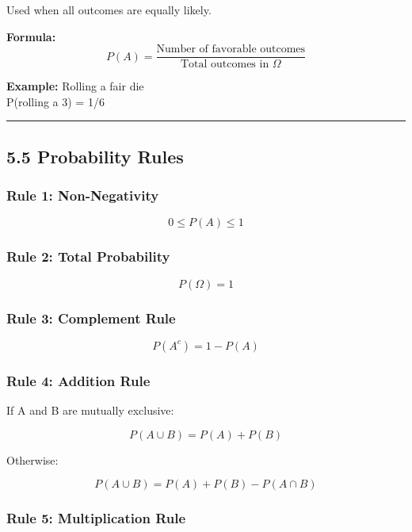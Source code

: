 \documentclass[
  letterpaper,
  DIV=11,
  numbers=noendperiod]{scrreprt}
\begin{document}
Used when all outcomes are equally likely.

\textbf{Formula:} \[
P(A) = \frac{\text{Number of favorable outcomes}}{\text{Total outcomes in } \Omega}
\]

\textbf{Example:} Rolling a fair die\\
P(rolling a 3) = 1/6

\begin{center}\rule{0.5\linewidth}{0.5pt}\end{center}

\subsection{5.5 Probability Rules}\label{probability-rules}

\subsubsection{Rule 1: Non-Negativity}\label{rule-1-non-negativity}

\[
0 \leq P(A) \leq 1
\]

\subsubsection{Rule 2: Total
Probability}\label{rule-2-total-probability}

\[
P(\Omega) = 1
\]

\subsubsection{Rule 3: Complement Rule}\label{rule-3-complement-rule}

\[
P(A^c) = 1 - P(A)
\]

\subsubsection{Rule 4: Addition Rule}\label{rule-4-addition-rule}

If A and B are mutually exclusive:

\[
P(A \cup B) = P(A) + P(B)
\]

Otherwise:

\[
P(A \cup B) = P(A) + P(B) - P(A \cap B)
\]

\subsubsection{Rule 5: Multiplication
Rule}\label{rule-5-multiplication-rule}
\end{document}
